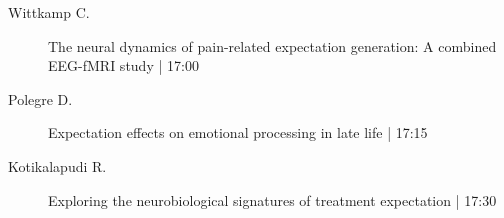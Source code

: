 \begin{symposium}
\begin{description}
                \item [ Wittkamp C.] The neural dynamics of pain-related expectation generation: A combined EEG-fMRI study \textcolor{mygray}{ | 17:00}    
                
                \item [ Polegre D.] Expectation effects on emotional processing in late life \textcolor{mygray}{ | 17:15}    
                
                \item [ Kotikalapudi R.] Exploring the neurobiological signatures of treatment expectation \textcolor{mygray}{ | 17:30}    
                
            \end{description} 
            \end{symposium}
            